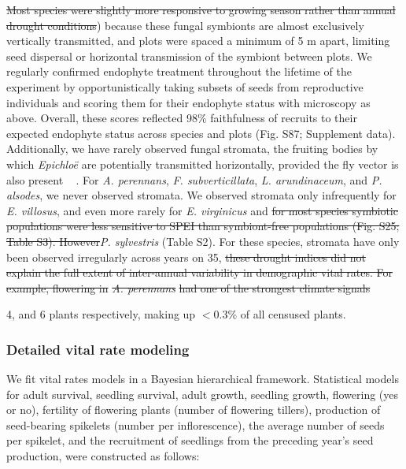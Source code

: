 \documentclass[lineno,sn-nature]{sn-jnl}%
\providecommand{\DIFadd}[1]{{\protect\color{blue}#1}} %
\providecommand{\DIFdel}[1]{{\protect\color{red}\protect\scriptsize\sout{#1}}}
\providecommand{\DIFadd}[1]{{\protect\color{blue}\uwave{#1}}} %
\providecommand{\DIFdel}[1]{{\protect\color{red}\sout{#1}}}                      %
\providecommand{\DIFaddbegin}{} %
\providecommand{\DIFaddend}{} %
\providecommand{\DIFdelbegin}{} %
\providecommand{\DIFdelend}{} %
\newcommand{\DIFscaledelfig}{0.5}
\newlength{\DIFdelgraphicswidth} %
\newlength{\DIFdelgraphicsheight} %
\newcommand{\DIFaddincludegraphics}[2][]{{\color{blue}\fbox{\DIFOincludegraphics[#1]{#2}}}} %
\newcommand{\DIFdelincludegraphics}[2][]{%
\sbox{\DIFdelgraphicsbox}{\DIFOincludegraphics[#1]{#2}}%
\settoboxwidth{\DIFdelgraphicswidth}{\DIFdelgraphicsbox} %
\settoboxtotalheight{\DIFdelgraphicsheight}{\DIFdelgraphicsbox} %
\scalebox{\DIFscaledelfig}{%
\parbox[b]{\DIFdelgraphicswidth}{\usebox{\DIFdelgraphicsbox}\\[-\baselineskip] \rule{\DIFdelgraphicswidth}{0em}}\llap{\resizebox{\DIFdelgraphicswidth}{\DIFdelgraphicsheight}{%
\setlength{\unitlength}{\DIFdelgraphicswidth}%
\begin{picture}(1,1)%
\thicklines\linethickness{2pt} %
{\color[rgb]{1,0,0}\put(0,0){\framebox(1,1){}}}%
{\color[rgb]{1,0,0}\put(0,0){\line( 1,1){1}}}%
{\color[rgb]{1,0,0}\put(0,1){\line(1,-1){1}}}%
\end{picture}%
}\hspace*{3pt}}} %
} %
\DeclareRobustCommand{\DIFaddbegin}{\DIFOaddbegin \let\includegraphics\DIFaddincludegraphics} %
\DeclareRobustCommand{\DIFaddend}{\DIFOaddend \let\includegraphics\DIFOincludegraphics} %
\DeclareRobustCommand{\DIFdelbegin}{\DIFOdelbegin \let\includegraphics\DIFdelincludegraphics} %
\DeclareRobustCommand{\DIFdelend}{\DIFOaddend \let\includegraphics\DIFOincludegraphics} %
\begin{document}
\begin{appendices}
{}%

\DIFdel{Most species were slightly more responsive to growing season rather than annual drought conditions}\DIFdelend \DIFaddbegin \DIFadd{) because these fungal symbionts are almost exclusively vertically transmitted, and plots were spaced a minimum of 5 m apart, limiting seed dispersal or horizontal transmission of the symbiont between plots. 
We regularly confirmed endophyte treatment throughout the lifetime of the experiment by opportunistically taking subsets of seeds from reproductive individuals and scoring them for their endophyte status with microscopy as above.
Overall, these scores reflected 98\% faithfulness of recruits to their expected endophyte status across species and plots (Fig. S87; Supplement data). 
Additionally, we have rarely observed fungal stromata, the fruiting bodies by which }\emph{\DIFadd{Epichlo\"e}} \DIFadd{are potentially transmitted horizontally, provided the fly vector is also present \mbox{%
\cite{bultman1995mutualistic}}\hspace{0pt}%
. 
For }\emph{\DIFadd{A. perennans}}\DIFaddend , \DIFaddbegin \emph{\DIFadd{F. subverticillata}}\DIFadd{, }\emph{\DIFadd{L. arundinaceum}}\DIFadd{, and }\emph{\DIFadd{P. alsodes}}\DIFadd{, we never observed stromata. 
We observed stromata only infrequently for }\emph{\DIFadd{E. villosus}}\DIFadd{, and even more rarely for }\emph{\DIFadd{E. virginicus}} \DIFaddend and \DIFdelbegin \DIFdel{for most species symbiotic populations were less sensitive to SPEI than symbiont-free populations (Fig. S25; Table S3).
	However}\DIFdelend \DIFaddbegin \emph{\DIFadd{P. sylvestris}} \DIFadd{(Table S2). 
For these species, stromata have only been observed irregularly across years on 35}\DIFaddend , \DIFdelbegin \DIFdel{these drought indices did not explain the full extent of inter-annual variability in demographic vital rates.
	For example, flowering in }\emph{\DIFdel{A. perennans}} %
\DIFdel{had one of the strongest climate signals }\DIFdelend \DIFaddbegin \DIFadd{4, and 6 plants respectively, making up $< 0.3$\% of all censused plants.

}

\subsubsection*{\DIFadd{Detailed vital rate modeling}}

\DIFadd{We fit vital rates models in a Bayesian hierarchical framework. 
Statistical models for adult survival, seedling survival, adult growth, seedling growth, flowering (yes or no), fertility of flowering plants (number of flowering tillers), production of seed-bearing spikelets (number per inflorescence), the average number of seeds per spikelet, and the recruitment of seedlings from the preceding year's seed production, were constructed as follows:

}
\end{appendices}
\end{document}
